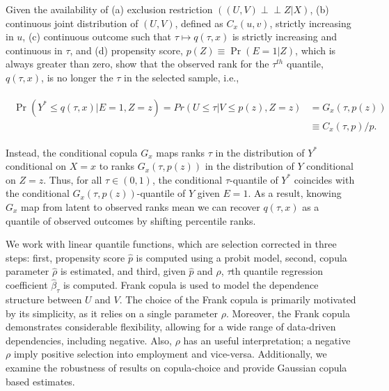 Given the availability of (a) exclusion restriction $((U,V) {\perp\!\!\!\perp} Z| X )$, (b) continuous joint distribution of $(U,V)$, defined as $C_{x}(u,v)$, strictly increasing in $u$, (c) continuous outcome such that $\tau\mapsto q(\tau, x)$ is strictly increasing and continuous in $\tau$, and (d)  propensity score, $p(Z)\equiv \Pr(E=1|Z)$, which is always greater than zero, \textcite{Arellano2017} show that the observed rank for the $\tau^{th}$ quantile, $q(\tau, x)$, is no longer the $\tau$ in the selected sample, i.e.,
\begin{linenomath*}\begin{align}
	\begin{split}		
		\Pr(Y^{*}\leq q(\tau, x)|E=1, Z=z) = Pr(U\leq \tau| V\leq p(z), Z=z)
		&=G_{x}(\tau, p(z)) \\
		&\equiv C_{x}(\tau, p)/p.
	\end{split}
\end{align}\end{linenomath*}
Instead, the conditional copula $G_{x}$ maps ranks $\tau$ in the distribution of $Y^{*}$ conditional on $X=x$ to ranks $G_{x}(\tau, p(z))$ in the distribution of $Y$ conditional on $Z=z$. Thus,  for all $\tau \in (0,1)$, the conditional $\tau$-quantile of $Y^{*}$ coincides with the conditional $G_{x}(\tau, p(z))$-quantile of $Y$ given $E=1$. As a result, knowing $G_{x}$ map from latent to observed ranks mean we can recover $q(\tau, x)$ as a quantile of observed outcomes by shifting percentile ranks. \par

We work with linear quantile functions, which are selection corrected in three steps: first, propensity score $\hat{p}$ is computed using a probit model, second, copula parameter $\hat{\rho}$ is estimated, and third, given $\hat{p}$ and $\hat{\rho}$, $\tau$th quantile regression coefficient $\hat{\beta}_{\tau}$ is computed. Frank copula is used to model the dependence structure between $U$ and $V$. The choice of the Frank copula is primarily motivated by its simplicity, as it relies on a single parameter $\rho$. Moreover, the Frank copula demonstrates considerable flexibility, allowing for a wide range of data-driven dependencies, including negative. Also, $\rho$ has an useful interpretation; a negative $\rho$ imply positive selection into employment and vice-versa.  Additionally, we examine the robustness of results on copula-choice and provide Gaussian copula based estimates.\par
 

